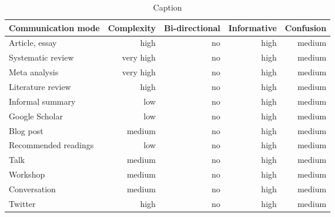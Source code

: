 \begin{table*}\centering
{}
\begin{tabular}{@{}lrrrr@{}}\toprule
Communication mode & Complexity & Bi-directional & Informative  & Confusion
\\\midrule
Article, essay      & high & no & high & medium  \\
Systematic review   & very high & no & high & medium\\
Meta analysis       & very high & no & high & medium\\
Literature review   & high & no & high & medium\\
Informal summary    & low & no & high & medium\\
Google Scholar      & low & no & high & medium\\
Blog post           & medium & no & high & medium\\
Recommended readings& low & no & high & medium\\
Talk                & medium & no & high & medium\\
Workshop            & medium & no & high & medium\\
Conversation        & medium & no & high & medium\\
Twitter             & high & no & high & medium\\
\bottomrule
\end{tabular}
\caption{Caption}
\end{table*}